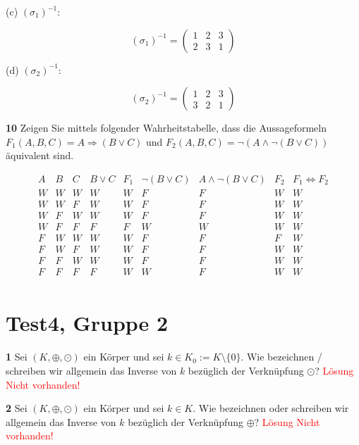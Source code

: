 \documentclass[11pt]{article}
\begin{document}
(c) \((\sigma_{1})^{-1}\):

\[
    (\sigma_{1})^{-1} = \begin{pmatrix} 1 & 2 & 3 \\ 2 & 3 & 1 \end{pmatrix}
\]

(d) \((\sigma_{2})^{-1}\):

\[
    (\sigma_{2})^{-1} = \begin{pmatrix} 1 & 2 & 3 \\ 3 & 2 & 1 \end{pmatrix}
\]


\textbf{10} Zeigen Sie mittels folgender Wahrheitstabelle, dass die Aussageformeln \(F_1(A,B,C) = A \Rightarrow (B \lor C)\) und \(F_2(A,B,C) = \neg(A \land \neg(B \lor C))\) äquivalent sind.

\[
    \begin{array}{ccc|c|c|c|c|c|c}
        A & B & C & B \lor C & F_1 & \neg(B \lor C) & A \land \neg(B \lor C) & F_2 & F_1 \Leftrightarrow F_2 \\
        \hline
        W & W & W & W & W & F & F & W & W \\
        W & W & F & W & W & F & F & W & W \\
        W & F & W & W & W & F & F & W & W \\
        W & F & F & F & F & W & W & W & W \\
        F & W & W & W & W & F & F & F & W \\
        F & W & F & W & W & F & F & W & W \\
        F & F & W & W & W & F & F & W & W \\
        F & F & F & F & W & W & F & W & W \\
    \end{array}
\]

\section{Test4, Gruppe 2}

    \textbf{1} Sei \((K, \oplus, \odot)\) ein Körper und sei \(k \in K_0 := K \setminus \{0\}\). Wie bezeichnen / schreiben wir allgemein das Inverse von \(k\) bezüglich der Verknüpfung \(\odot\)?\newline
    \textcolor{red}{Lösung Nicht vorhanden!}\newline

    \textbf{2} Sei \((K, \oplus, \odot)\) ein Körper und sei \(k \in K\). Wie bezeichnen oder schreiben wir allgemein das Inverse von \(k\) bezüglich der Verknüpfung \(\oplus\)?\newline
    \textcolor{red}{Lösung Nicht vorhanden!}\newline
\end{document}

